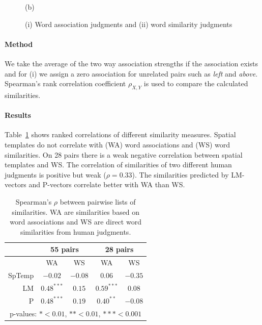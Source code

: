 \begin{figure}
\begin{center}
\begin{minipage}{0.4\linewidth}
\begin{center}
      (b)
      \end{center}%
    \end{minipage}
    \caption{(i) Word association judgments and (ii) word similarity judgments}
  \label{splu2019:fig:humansim}
\end{center}
\end{figure}

\paragraph{Method}
We take the average of the two way association strengths if the association
exists and for (i) %
we assign a zero association for unrelated pairs such as \emph{left} and
\emph{above}. Spearman's rank correlation coefficient $\rho_{X,Y}$ is used to compare the calculated similarities.

\paragraph{Results} Table~\ref{splu2019:tab:humanjudgments} shows ranked
correlations of different similarity measures.
Spatial templates do not correlate with (WA)  word associations and (WS) word
similarities.
On 28 pairs there is a weak negative correlation between spatial templates and
WS. The correlation of similarities of two different human judgments is
positive but weak ($\rho = 0.33$). The similarities predicted by LM-vectors and
P-vectors correlate better with WA than WS.

\begin{table}[ht]
    \centering 
      \begin{tabular}{r|c|c||c|c}
        & \multicolumn{2}{c||}{55 pairs} & \multicolumn{2}{|c}{28 pairs} \\
        \hline
        &
        WA &
        WS &
        WA &
        WS \\
      \hline
      SpTemp & $-0.02$       & $-0.08$ & $0.06$       & $-0.35$ \\
      LM     & $ 0.48^{***}$ & $ 0.15$ & $0.59^{***}$ & $ 0.08$ \\
      P & $ 0.48^{***}$ & $ 0.19$ & $0.40^{**}$  & $-0.08$ \\
      \hline
      \multicolumn{5}{c}{p-values: $* < 0.01$, $** < 0.01$, $*** < 0.001$} \\
      \end{tabular}
	  \vspace{0.5em}
      \caption{
        Spearman's $\rho$ between pairwise lists of similarities.
        WA are similarities based on word associations and WS are direct word
        similarities from human judgments.}
      \label{splu2019:tab:humanjudgments}
\end{table}

